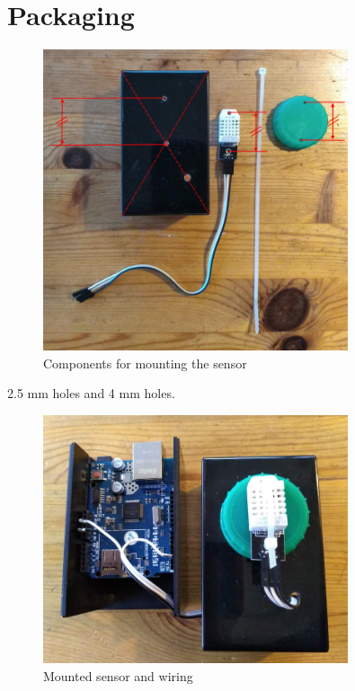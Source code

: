 \documentclass[a4paper, 12pt]{article}
\begin{document}
\section{Packaging}

\begin{figure}[H]
  \centering
  \includegraphics[width=0.8\textwidth]{sensor-mount.jpg}
  \caption{Components for mounting the sensor}
\end{figure}



2.5 mm holes and 4 mm holes.

\begin{figure}[H]
  \centering
  \includegraphics[width=0.8\textwidth]{packaging.jpg}
  \caption{Mounted sensor and wiring}
\end{figure}
\end{document}

